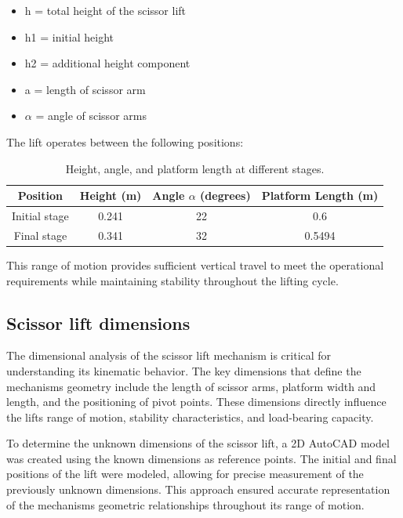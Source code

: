 \documentclass[../../main]{subfiles}
\begin{document}
\begin{itemize}
\item
  h = total height of the scissor lift
\item
  h1 = initial height
\item
  h2 = additional height component
\item
  a = length of scissor arm
\item
  $\alpha$ = angle of scissor arms
\end{itemize}

The lift operates between the following positions:

\begin{table}[h!]
  \centering
  \begin{tcolorbox}[
    colback=red!5!white,colframe=red!75!black,
    title={\textbf{ Height \& angle}},
    fonttitle=\bfseries, coltitle=white, width=0.859\linewidth]
  \begin{tabular}{|c|c|c|c|}
      \hline \rowcolor{red!20}
      Position & Height (m) & Angle $\alpha$ (degrees) & Platform Length (m) \\ \hline
      Initial stage & 0.241 & 22 & 0.6 \\ \hline
      Final stage & 0.341 & 32 & 0.5494 \\ \hline
  \end{tabular}
\end{tcolorbox}
\caption{Height, angle, and platform length at different stages.}
\end{table}

This range of motion provides sufficient vertical travel to meet the
operational requirements while maintaining stability throughout the
lifting cycle.

\subsection{Scissor lift dimensions}

The dimensional analysis of the scissor lift mechanism is critical for
understanding its kinematic behavior. The key dimensions that define the
mechanism\textquotesingle s geometry include the length of scissor arms,
platform width and length, and the positioning of pivot points. These
dimensions directly influence the lift\textquotesingle s range of
motion, stability characteristics, and load-bearing capacity.

To determine the unknown dimensions of the scissor lift, a 2D AutoCAD
model was created using the known dimensions as reference points. The
initial and final positions of the lift were modeled, allowing for
precise measurement of the previously unknown dimensions. This approach
ensured accurate representation of the mechanism\textquotesingle s
geometric relationships throughout its range of motion.
\end{document}

